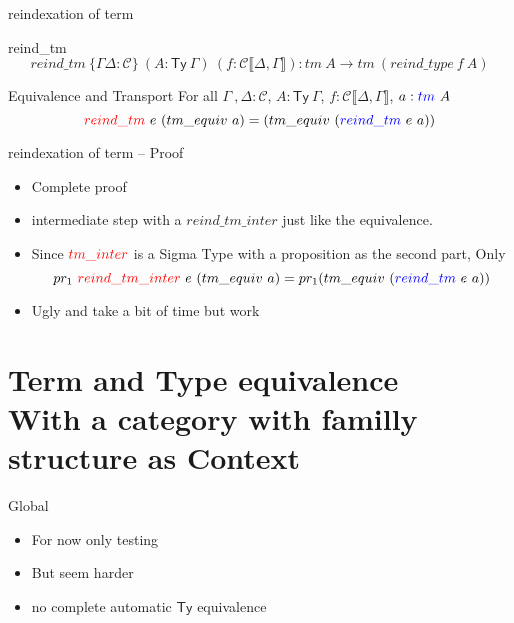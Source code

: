 \documentclass[
  ignorenonframetext,
  aspectratio=169,
  usenames,
  dvipsnames
]{beamer}
\newcommand{\constfont}[1]{\ensuremath{\mathsf{#1}}}
\newcommand{\CC}{{\mathcal{C}}}
\newcommand{\Ty}{\constfont{Ty}}
\newcommand{\rl}[1]{\color{red}#1\color{black}}
\newcommand{\bl}[1]{\color{blue}#1\color{black}}
\begin{document}
\begin{frame}{reindexation of term}
  \begin{block}{reind\_tm}
  $$reind\_tm\ \{\Gamma \Delta :\CC\}\ (A: \Ty\ \Gamma)\  (f :\CC \llbracket \Delta,\Gamma \rrbracket): tm\ A \rightarrow tm\ (reind\_type\ f\ A)$$
  \end{block}
  \begin{block}{Equivalence and Transport}
  For all $\Gamma\ ,\Delta : \CC$, $A : \Ty\ \Gamma$, $f :\CC \llbracket \Delta,\Gamma \rrbracket$, $a : \bl{tm}\ A$
  $$ \rl{reind\_tm}\ e\ (tm\_equiv\ a) = (tm\_equiv\ (\bl{reind\_tm}\ e\ a))$$
  \end{block}
\end{frame}

\begin{frame}{reindexation of term -- Proof}
  \begin{itemize}
    \item Complete proof
    \item intermediate step with a $reind\_tm\_inter$ just like the equivalence.
    \item Since $\rl{tm\_inter}$ is a Sigma Type with a proposition as the second part, Only $$ pr_1\ \rl{reind\_tm\_inter}\ e\ (tm\_equiv\ a) =  pr_1 (tm\_equiv\ (\bl{reind\_tm}\ e\ a))$$
    \item Ugly and take a bit of time but work
\end{itemize}
\end{frame}

\section{Term and Type equivalence \\ \smalltiny With a category with familly structure as Context}
\begin{frame}{Global}
\begin{itemize}
  \item For now only testing
  \item But seem harder
  \item no complete automatic $\Ty$ equivalence
\end{itemize}
\end{frame}
\end{document}
